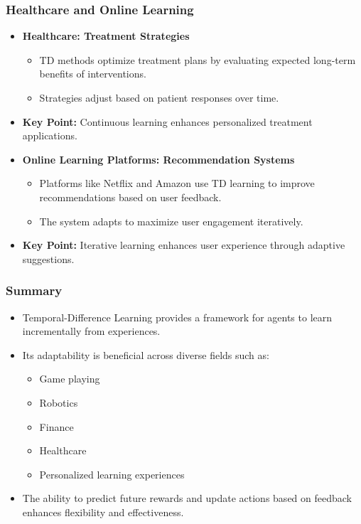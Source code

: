 \documentclass[aspectratio=169]{beamer}
\begin{document}
\begin{frame}[fragile]
    \frametitle{Healthcare and Online Learning}
    \begin{itemize}
        \item \textbf{Healthcare: Treatment Strategies}
        \begin{itemize}
            \item TD methods optimize treatment plans by evaluating expected long-term benefits of interventions.
            \item Strategies adjust based on patient responses over time.
        \end{itemize}
        \item \textbf{Key Point:} Continuous learning enhances personalized treatment applications.
    \end{itemize}

    \begin{itemize}
        \item \textbf{Online Learning Platforms: Recommendation Systems}
        \begin{itemize}
            \item Platforms like Netflix and Amazon use TD learning to improve recommendations based on user feedback.
            \item The system adapts to maximize user engagement iteratively.
        \end{itemize}
        \item \textbf{Key Point:} Iterative learning enhances user experience through adaptive suggestions.
    \end{itemize}
\end{frame}

\begin{frame}[fragile]
    \frametitle{Summary}
    \begin{itemize}
        \item Temporal-Difference Learning provides a framework for agents to learn incrementally from experiences.
        \item Its adaptability is beneficial across diverse fields such as:
        \begin{itemize}
            \item Game playing
            \item Robotics
            \item Finance
            \item Healthcare
            \item Personalized learning experiences
        \end{itemize}
        \item The ability to predict future rewards and update actions based on feedback enhances flexibility and effectiveness.
    \end{itemize}
\end{frame}
\end{document}
